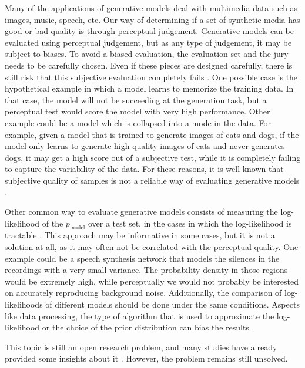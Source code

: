 Many of the applications of generative models deal with multimedia data such as images, music, speech, etc. Our way of determining if a set of synthetic media has good or bad quality is through perceptual judgement. Generative models can be evaluated using perceptual judgement, but as any type of judgement, it may be subject to biases. To avoid a biased evaluation, the evaluation set and the jury needs to be carefully chosen. Even if these pieces are designed carefully, there is still risk that this subjective evaluation completely fails \autocite{Goodfellow2016}. One possible case is the hypothetical example in which a model learns to memorize the training data. In that case, the model will not be succeeding at the generation task, but a perceptual test would score the model with very high performance. Other example could be a model which is collapsed into a mode in the data. For example, given a model that is trained to generate images of cats and dogs, if the model only learns to generate high quality images of cats and never generates dogs, it may get a high score out of a subjective test, while it is completely failing to capture the variability of the data. For these reasons, it is well known that subjective quality of samples is not a reliable way of evaluating generative models \autocite{denton2015}.

Other common way to evaluate generative models consists of measuring the log-likelihood of the $p_\mathrm{model}$ over a test set, in the cases in which the log-likelihood is tractable \autocite{Goodfellow2016}. This approach may be informative in some cases, but it is not a solution at all, as it may often not be correlated with the perceptual quality. One example could be a speech synthesis network that models the silences in the recordings with a very small variance. The probability density in those regions would be extremely high, while perceptually we would not probably be interested on accurately reproducing background noise. Additionally, the comparison of log-likelihoods of different models should be done under the same conditions. Aspects like data processing, the type of algorithm that is used to approximate the log-likelihood or the choice of the prior distribution can bias the results \autocite{Goodfellow2016}.

This topic is still an open research problem, and many studies have already provided some insights about it \autocite{theis2016a, sajjadi2018}. However, the problem remains still unsolved.



